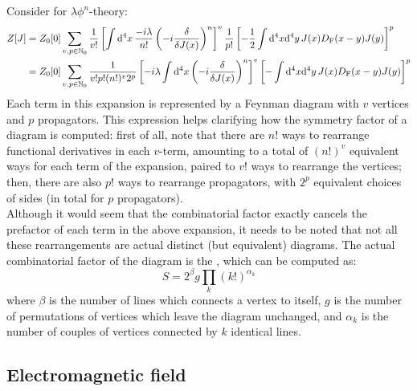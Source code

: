 Consider  for $ \lambda \phi^n $-theory:
\begin{equation*}
  \begin{split}
    Z[J]
    & = Z_0[0] \sum_{v,p \in \mathbb{N}_0} \frac{1}{v!} \left[ \int \mathrm{d}^4x\, \frac{-i \lambda}{n!} \left( -i \frac{\delta}{\delta J(x)} \right)^n \right]^v \frac{1}{p!} \left[ - \frac{1}{2} \int \mathrm{d}^4x \mathrm{d}^4y\, J(x) D_\text{F}(x-y) J(y) \right]^p \\
    & = Z_0[0] \sum_{v,p \in \mathbb{N}_0} \frac{1}{v! p! (n!)^v 2^p} \left[ - i \lambda \int \mathrm{d}^4x \left( -i \frac{\delta}{\delta J(x)} \right)^n \right]^v \left[ - \int \mathrm{d}^4x \mathrm{d}^4y\, J(x) D_\text{F}(x-y) J(y) \right]^p
  \end{split}
\end{equation*}
Each term in this expansion is represented by a Feynman diagram with $ v $ vertices and $ p $ propagators. This expression helps clarifying how the symmetry factor of a diagram is computed: first of all, note that there are $ n! $ ways to rearrange functional derivatives in each $ v $-term, amounting to a total of $ (n!)^v $ equivalent ways for each term of the expansion, paired to $ v! $ ways to rearrange the vertices; then, there are also $ p! $ ways to rearrange propagators, with $ 2^p $ equivalent choices of sides (in total for $ p $ propagators). \\
Although it would seem that the combinatorial factor exactly cancels the prefactor of each term in the above expansion, it needs to be noted that not all these rearrangements are actual distinct (but equivalent) diagrams. The actual combinatorial factor of the diagram is the , which can be computed as:
\begin{equation}
  S = 2^\beta g \prod_k (k!)^{\alpha_k}
\end{equation}
where $ \beta $ is the number of lines which connects a vertex to itself, $ g $ is the number of permutations of vertices which leave the diagram unchanged, and $ \alpha_k $ is the number of couples of vertices connected by $ k $ identical lines.

\subsection{Electromagnetic field}

